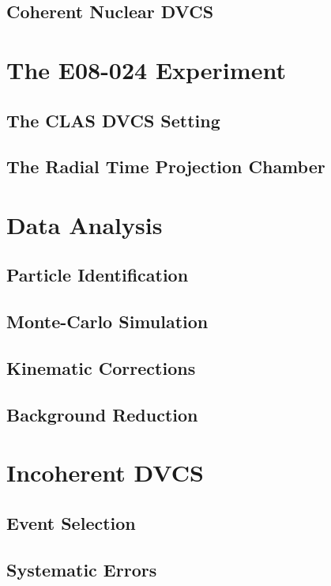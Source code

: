 \documentclass[aps,prc,preprint,superscriptaddress]{revtex4}
\begin{document}
  \subsection{Coherent Nuclear DVCS}

\section{The E08-024 Experiment}

  \subsection{The CLAS DVCS Setting}

  \subsection{The Radial Time Projection Chamber}

\section{Data Analysis}

  \subsection{Particle Identification}

  \subsection{Monte-Carlo Simulation}

  \subsection{Kinematic Corrections}

  \subsection{Background Reduction}

\section{Incoherent DVCS}

  \subsection{Event Selection}

  \subsection{Systematic Errors}
\end{document}
